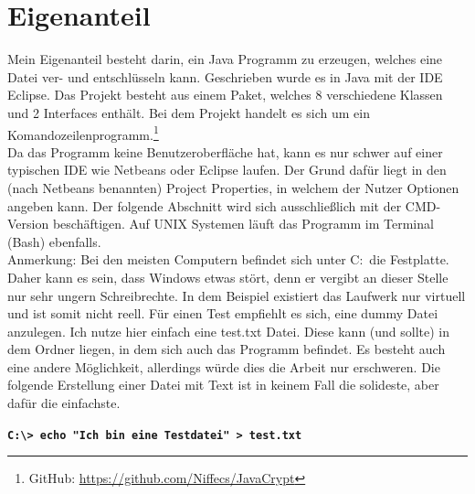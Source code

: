 \section{Eigenanteil}

Mein Eigenanteil besteht darin, ein Java Programm zu erzeugen, welches eine Datei ver- und entschlüsseln kann. Geschrieben wurde es in Java mit der IDE Eclipse. Das Projekt besteht aus einem Paket, welches 8 verschiedene Klassen und 2 Interfaces enthält. Bei dem Projekt handelt es sich um ein Komandozeilenprogramm.\footnote{GitHub:  \url{https://github.com/Niffecs/JavaCrypt}} \\


Da das Programm keine Benutzeroberfläche hat, kann es nur schwer auf einer typischen IDE wie Netbeans oder Eclipse laufen. Der Grund dafür liegt in den (nach Netbeans benannten) Project Properties, in welchem der Nutzer Optionen angeben kann. Der folgende Abschnitt wird sich ausschließlich mit der CMD-Version beschäftigen. Auf UNIX Systemen läuft das Programm im Terminal (Bash) ebenfalls.\\

Anmerkung: Bei den meisten Computern befindet sich unter C:\ die Festplatte. Daher kann es sein, dass Windows etwas stört, denn er vergibt an dieser Stelle nur sehr ungern Schreibrechte. In dem Beispiel existiert das Laufwerk nur virtuell und ist somit nicht reell.
Für einen Test empfiehlt es sich, eine dummy Datei anzulegen. Ich nutze hier einfach eine test.txt Datei. Diese kann (und sollte) in dem Ordner liegen, in dem sich auch das Programm befindet. Es besteht auch eine andere Möglichkeit, allerdings würde dies die Arbeit nur erschweren. Die folgende Erstellung einer Datei mit Text ist in keinem Fall die solideste, aber dafür die einfachste.\\

\begin{center}
		\texttt{\textbf{C:\textbackslash > echo "Ich bin eine Testdatei" > test.txt}}
\end{center}

